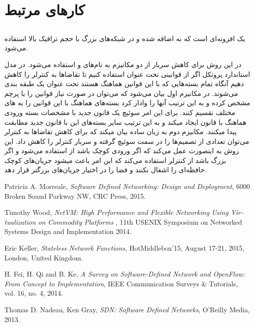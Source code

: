 ﻿\documentclass[11pt]{article}
\begin{document}
\section{کارهای مرتبط}
\subsection{}

\par
 یک افزونه‌ای است که به  اضافه شده و در شبکه‌های بزرگ با حجم ترافیک بالا استفاده می‌شود.
\par
در این روش برای کاهش سربار  از دو مکانیزم به نام‌های  و  استفاده می‌شود.
در مدل استاندارد پروتکل  اگر از قوانینی تحت عنوان  استفاده کنیم تا تقاضاها به کنترلر را کاهش دهیم آنگاه تمام بسته‌هایی که با این قوانین هماهنگ هستند تحت عنوان یک  طبقه بندی می‌شوند. در مکانیزم اول  بیان می‌شود که می‌توان در صورت نیاز قوانین  را با پرچم  مشخص کرده و به این ترتیب آنها را وادار کرد بسته‌های هماهنگ با این قوانین را به  های مختلف تقسیم کنند. برای این امر سوئیچ یک قانون جدید با مشخصات بسته ورودی هماهنگ با قانون  ایجاد میکند و به این ترتیب سایر بسته‌های این  با قانون جدید مطابقت پیدا میکنند. 
مکانیزم دوم به زبان ساده بیان میکند که برای کاهش تقاضاها به کنترلر می‌توان تعدادی از تصمیم‌ها را در سمت سوئیچ گرفته و سربار  کنترلر را کاهش داد. 
این روش به اینصورت عمل می‌کند که اگر  ورودی کوچک باشد از  استفاده می‌شود و اگر  بزرگ باشد از کنترلر استفاده می‌کند که این امر باعث میشود جریان‌های کوچک حافظه‌ای را اشغال نکنند و فضا را در اختیار جریان‌های بزرگتر قرار دهد.


\begin{thebibliography}{9}
	\begin{latin}
		Patricia A. Morreale,
		\emph{Software Defined Networking: Design and Deployment},
		6000 Broken Sound Parkway NW,
		CRC Press,
		2015.
	\end{latin}
	\begin{latin}
		Timothy Wood,
		\emph{NetVM: High Performance and Flexible Networking
Using Virtualization on Commodity Platforms },
		11th USENIX Symposium on Networked Systems Design and Implementation
  		2014.
	\end{latin}
	\begin{latin}
		Eric Keller,
		\emph{Stateless Network Functions},
		HotMiddlebox’15, August 17-21, 2015, London, United Kingdom.
	\end{latin}
	\begin{latin}
		H. Fei, H. Qi and B. Ke,
		\emph{A Survey on Software-Defined Network and OpenFlow: From Concept to Implementation},
		IEEE Communication Surveys \& Tutorials, vol. 16, no. 4,
 		2014.
	\end{latin}
	\begin{latin}
		Thomas D. Nadeau, Ken Gray,
		\emph{SDN: Software Defined Networks},
		O'Reilly Media,
		2013.
	\end{latin}
\end{thebibliography}
\end{document}
